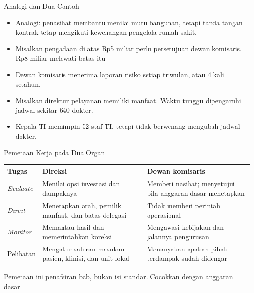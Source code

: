 \documentclass[aspectratio=169, table, 12pt]{beamer}
\begin{document}
\begin{frame}{{\Large Analogi dan Dua Contoh}}
  \vspace{4pt}
  \small
  \begin{itemize}
    \item Analogi: penasihat membantu menilai mutu bangunan, tetapi tanda tangan kontrak tetap
          mengikuti kewenangan pengelola rumah sakit.
    \item Misalkan pengadaan di atas Rp5 miliar perlu persetujuan dewan komisaris. Rp8 miliar
          melewati batas itu.
    \item Dewan komisaris menerima laporan risiko setiap triwulan, atau 4 kali setahun.
    \item Misalkan direktur pelayanan memiliki manfaat. Waktu tunggu dipengaruhi jadwal sekitar
          640 dokter.
    \item Kepala TI memimpin 52 staf TI, tetapi tidak berwenang mengubah jadwal dokter.
  \end{itemize}
\end{frame}

\begin{frame}{{\Large Pemetaan Kerja pada Dua Organ}}
  \vspace{4pt}
  \footnotesize
  \begin{tabularx}{\textwidth}{|>{\raggedright\arraybackslash}p{}|>{\raggedright\arraybackslash}X|>{\raggedright\arraybackslash}X|}
    \hline
    \textbf{Tugas} & \textbf{Direksi} & \textbf{Dewan komisaris} \\ \hline
    \textit{Evaluate} & Menilai opsi investasi dan dampaknya & Memberi nasihat; menyetujui bila
    anggaran dasar menetapkan \\ \hline
    \textit{Direct} & Menetapkan arah, pemilik manfaat, dan batas delegasi & Tidak memberi perintah
    operasional \\ \hline
    \textit{Monitor} & Memantau hasil dan memerintahkan koreksi & Mengawasi kebijakan dan jalannya
    pengurusan \\ \hline
    Pelibatan & Mengatur saluran masukan pasien, klinisi, dan unit lokal & Menanyakan apakah pihak
    terdampak sudah didengar \\ \hline
  \end{tabularx}

  \vspace{6pt}
  \small Pemetaan ini penafsiran bab, bukan isi standar. Cocokkan dengan anggaran dasar.
\end{frame}
\end{document}
